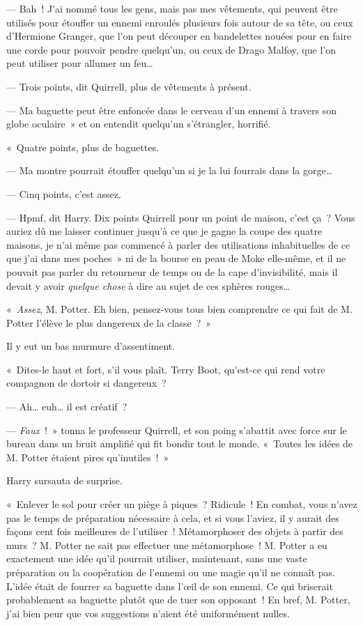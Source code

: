 --- Bah~! J'ai nommé tous les gens, mais pas mes vêtements, qui peuvent être utilisés pour étouffer un ennemi enroulés plusieurs fois autour de sa tête, ou ceux d'Hermione Granger, que l'on peut découper en bandelettes nouées pour en faire une corde pour pouvoir pendre quelqu'un, ou ceux de Drago Malfoy, que l'on peut utiliser pour allumer un feu…

--- Trois points, dit Quirrell, plus de vêtements à présent.

--- Ma baguette peut être enfoncée dans le cerveau d'un ennemi à travers son globe oculaire~» et on entendit quelqu'un s'étrangler, horrifié.

«~Quatre points, plus de baguettes.

--- Ma montre pourrait étouffer quelqu'un si je la lui fourrais dans la gorge…

--- Cinq points, c'est assez.

--- Hpmf, dit Harry. Dix points Quirrell pour un point de maison, c'est ça~?
Vous auriez dû me laisser continuer jusqu'à ce que je gagne la coupe des quatre maisons, je n'ai même pas commencé à parler des utilisations inhabituelles de ce que j'ai dans mes poches~» ni de la bourse en peau de Moke elle-même, et il ne pouvait pas parler du retourneur de temps ou de la cape d'invisibilité, mais il devait y avoir \emph{quelque chose} à dire au sujet de ces sphères rouges…

«~\emph{Assez}, M. Potter.
Eh bien, pensez-vous tous bien comprendre ce qui fait de M. Potter l'élève le plus dangereux de la classe~?~»

Il y eut un bas murmure d'assentiment.

«~Dites-le haut et fort, s'il vous plaît. Terry Boot, qu'est-ce qui rend votre compagnon de dortoir si dangereux~?

--- Ah… euh… il est créatif~?

--- \emph{Faux}~!~» tonna le professeur Quirrell, et son poing s'abattit avec force sur le bureau dans un bruit amplifié qui fit bondir tout le monde. «~Toutes les idées de M. Potter étaient pires qu'inutiles~!~»

Harry sursauta de surprise.

«~Enlever le sol pour créer un piège à piques~? Ridicule~! En combat, vous n'avez pas le temps de préparation nécessaire à cela, et si vous l'aviez, il y aurait des façons cent fois meilleures de l'utiliser~! Métamorphoser des objets à partir des murs~? M. Potter ne sait pas effectuer une métamorphose~! M. Potter a eu exactement une idée qu'il pourrait utiliser, maintenant, sans une vaste préparation ou la coopération de l'ennemi ou une magie qu'il ne connaît pas. L'idée était de fourrer sa baguette dans l'œil de son ennemi. Ce qui briserait probablement sa baguette plutôt que de tuer son opposant~! En bref, M. Potter, j'ai bien peur que vos suggestions n'aient été uniformément nulles.

